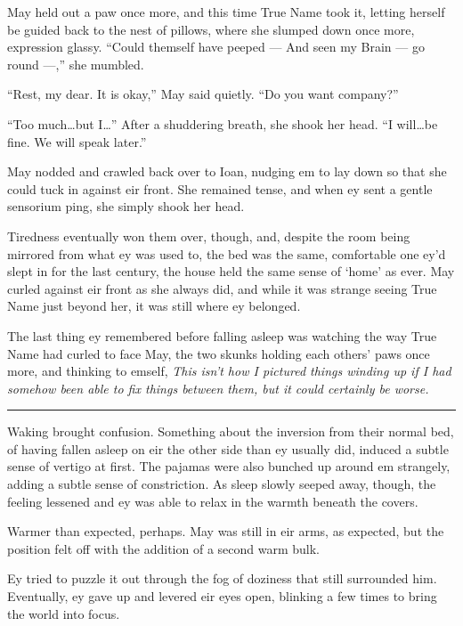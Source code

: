 May held out a paw once more, and this time True Name took it, letting herself be guided back to the nest of pillows, where she slumped down once more, expression glassy. ``Could themself have peeped — And seen my Brain — go round —,'' she mumbled.

``Rest, my dear. It is okay,'' May said quietly. ``Do you want company?''

``Too much\ldots but I\ldots{}'' After a shuddering breath, she shook her head. ``I will\ldots be fine. We will speak later.''

May nodded and crawled back over to Ioan, nudging em to lay down so that she could tuck in against eir front. She remained tense, and when ey sent a gentle sensorium ping, she simply shook her head.

Tiredness eventually won them over, though, and, despite the room being mirrored from what ey was used to, the bed was the same, comfortable one ey'd slept in for the last century, the house held the same sense of `home' as ever. May curled against eir front as she always did, and while it was strange seeing True Name just beyond her, it was still where ey belonged.

The last thing ey remembered before falling asleep was watching the way True Name had curled to face May, the two skunks holding each others' paws once more, and thinking to emself, \emph{This isn't how I pictured things winding up if I had somehow been able to fix things between them, but it could certainly be worse.}

\begin{center}\rule{0.5\linewidth}{0.5pt}\end{center}

Waking brought confusion. Something about the inversion from their normal bed, of having fallen asleep on eir the other side than ey usually did, induced a subtle sense of vertigo at first. The pajamas were also bunched up around em strangely, adding a subtle sense of constriction. As sleep slowly seeped away, though, the feeling lessened and ey was able to relax in the warmth beneath the covers.

Warmer than expected, perhaps. May was still in eir arms, as expected, but the position felt off with the addition of a second warm bulk.

Ey tried to puzzle it out through the fog of doziness that still surrounded him. Eventually, ey gave up and levered eir eyes open, blinking a few times to bring the world into focus.

